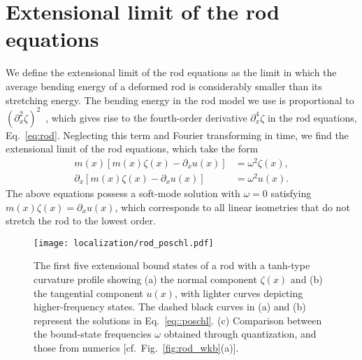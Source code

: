\section{Extensional limit of the rod equations}
\label{app:extensional}

We define the extensional limit of the rod equations as the limit in which the average bending energy of a deformed rod is considerably smaller than its stretching energy.
The bending energy in the rod model we use is proportional to $(\partial_{x}^{2} \zeta)^{2}$~\cite{kernes2021}, which gives rise to the fourth-order derivative $\partial_x^{4}\zeta$ in the rod equations, Eq.~\eqref{eq:rod}.
Neglecting this term and Fourier transforming in time, we find the extensional limit of the rod equations, which take the form
%
\begin{subequations}
  \begin{align}
  \label{eq::rod_ext1}
  m(x)\left[m(x)\zeta(x) - \partial_{x}u(x)\right] &= \omega^{2}\zeta(x),\\
  \partial_{x}\left[m(x)\zeta(x) - \partial_{x}u(x)\right] &= \omega^{2}u(x).
  \label{eq::rod_ext2}
  \end{align}
\end{subequations}
%
The above equations possess a soft-mode solution with $\omega = 0$ satisfying $m(x)\zeta(x) = \partial_{x}u(x)$, which corresponds to all linear isometries that do not stretch the rod to the lowest order.
%
\begin{figure}
  \begin{center}
    \texttt{[image: localization/rod\_poschl.pdf]}
  \end{center}
  \caption{%
    The first five extensional bound states of a rod with a tanh-type curvature profile showing (a) the normal component $\zeta(x)$ and (b) the tangential component $u(x)$, with lighter curves depicting higher-frequency states.
    The dashed black curves in (a) and (b) represent the solutions in Eq.~\eqref{eq::poschl}.
    (c) Comparison between the bound-state frequencies $\omega$ obtained through quantization, and those from numerics [cf.~Fig.~\ref{fig:rod_wkb}(a)].
  }
  \label{fig:poschl}
\end{figure}

